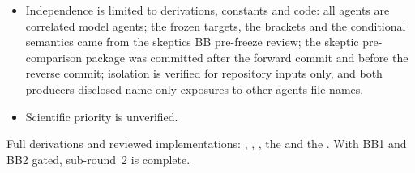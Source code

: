 \begin{gatequote}
\begin{itemize}
(D9, moot at this verdict); several inherited control texts were written for
BA2 or BB1 (D6); the item-3 inheritance is read within the admitted scope (D4,
D11).
\item Independence is limited to derivations, constants and code: all agents
are correlated model agents; the frozen targets, the brackets and the
conditional semantics came from the skeptic\textquotesingle{}s BB pre-freeze
review; the skeptic pre-comparison package was committed after the forward
commit and before the reverse commit; isolation is verified for repository
inputs only, and both producers disclosed name-only exposures to other
agents\textquotesingle{} file names.
\item Scientific priority is unverified.
\end{itemize}
\end{gatequote}
Full derivations and reviewed implementations:
,
,
, the
 and the .
With BB1 and BB2 gated, sub-round~2 is complete.
